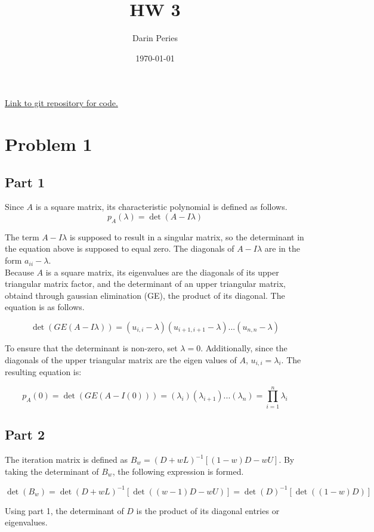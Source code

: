 \documentclass{article}
\title{HW 3}
\author{Darin Peries}
\date{\today}
\begin{document}
\maketitle

\href{https://github.com/dperry17/MATH609HW/tree/main/HW3}{Link to git repository for code.}

\section*{Problem 1}

\subsection*{Part 1}

\noindent Since $A$ is a square matrix, its characteristic polynomial is defined as follows.
$$p_A(\lambda)=\det(A-I\lambda)$$

\noindent The term $A-I\lambda$ is supposed to result in a singular matrix, so the determinant in the equation above
is supposed to equal zero. The diagonals of $A-I\lambda$ are in the form $a_{ii}-\lambda$. \\

\noindent Because $A$ is a square matrix, its eigenvalues are the diagonals of its upper triangular
matrix factor, and the determinant of an upper triangular matrix, obtaind through gaussian elimination (GE), the product of its diagonal. The equation is as 
follows.

$$\det(GE(A-I\lambda))=(u_{i,i} - \lambda)(u_{i+1,i+1}-\lambda)...(u_{n,n}-\lambda)$$

\noindent To ensure that the determinant is non-zero, set $\lambda=0$. Additionally, since the diagonals of the upper
triangular matrix are the eigen values of $A$, $u_{i,i} = \lambda_i$. The resulting equation is:

$$p_A(0)=\det(GE(A-I(0)))=(\lambda_i)(\lambda_{i+1})...(\lambda_n)=\prod_{i=1}^{n}\lambda_i$$

\subsection*{Part 2}
The iteration matrix is defined as $B_w = (D+wL)^{-1}[(1-w)D-wU]$. By taking the determinant of $B_w$,
the following expression is formed.

$$\det(B_w) = \det(D+wL)^{-1}[\det((w-1)D-wU)] = \det(D)^{-1}[\det((1-w)D)]$$

\noindent Using part 1, the determinant of $D$ is the product of its diagonal entries or eigenvalues.
\end{document}
